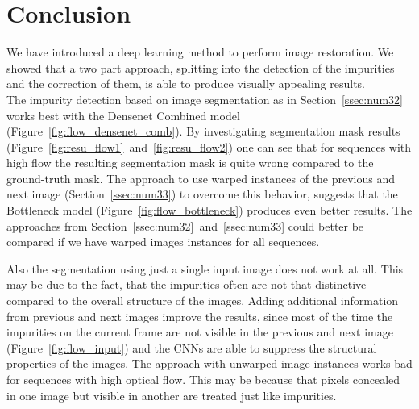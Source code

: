 \begin{table}[H]
\begin{center}
\label{fig:resu_pm}
\end{center}\end{table}

\newpage
\section{Conclusion}
\label{sec:num6}

We have introduced a deep learning method to perform image restoration. We showed that a two part approach, splitting into the detection of the impurities and the correction of them, is able to produce visually appealing results.\\

The impurity detection based on image segmentation as in Section~\ref{ssec:num32} works best with the Densenet Combined model (Figure~\ref{fig:flow_densenet_comb}). By investigating segmentation mask results (Figure~\ref{fig:resu_flow1}~and~\ref{fig:resu_flow2}) one can see that for sequences with high flow the resulting segmentation mask is quite wrong compared to the ground-truth mask. The approach to use warped instances of the previous and next image (Section~\ref{ssec:num33}) to overcome this behavior, suggests that the Bottleneck model (Figure~\ref{fig:flow_bottleneck}) produces even better results. The approaches from Section~\ref{ssec:num32}~and~\ref{ssec:num33} could better be compared if we have warped images instances for all sequences.

Also the segmentation using just a single input image does not work at all. This may be due to the fact, that the impurities often are not that distinctive compared to the overall structure of the images. Adding additional information from previous and next images improve the results, since most of the time the impurities on the current frame are not visible in the previous and next image (Figure~\ref{fig:flow_input}) and the CNNs are able to suppress the structural properties of the images. The approach with unwarped image instances works bad for sequences with high optical flow. This may be because that pixels concealed in one image but visible in another are treated just like impurities. \\

